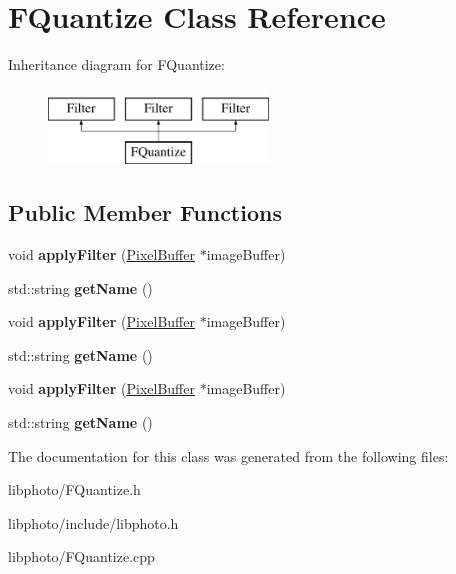 \hypertarget{classFQuantize}{\section{F\-Quantize Class Reference}
\label{classFQuantize}
}
Inheritance diagram for F\-Quantize\-:\begin{figure}[H]
\begin{center}
\leavevmode
\includegraphics[height=2.000000cm]{classFQuantize}
\end{center}
\end{figure}
\subsection*{Public Member Functions}
\begin{DoxyCompactItemize}
\item 
\hypertarget{classFQuantize_a093d0f34480882da50d994eb4e450c64}{void {\bfseries apply\-Filter} (\hyperlink{classPixelBuffer}{Pixel\-Buffer} $\ast$image\-Buffer)}\label{classFQuantize_a093d0f34480882da50d994eb4e450c64}

\item 
\hypertarget{classFQuantize_a9432e52568e0b7608522569e0a438a1d}{std\-::string {\bfseries get\-Name} ()}\label{classFQuantize_a9432e52568e0b7608522569e0a438a1d}

\item 
\hypertarget{classFQuantize_a093d0f34480882da50d994eb4e450c64}{void {\bfseries apply\-Filter} (\hyperlink{classPixelBuffer}{Pixel\-Buffer} $\ast$image\-Buffer)}\label{classFQuantize_a093d0f34480882da50d994eb4e450c64}

\item 
\hypertarget{classFQuantize_a9432e52568e0b7608522569e0a438a1d}{std\-::string {\bfseries get\-Name} ()}\label{classFQuantize_a9432e52568e0b7608522569e0a438a1d}

\item 
\hypertarget{classFQuantize_a093d0f34480882da50d994eb4e450c64}{void {\bfseries apply\-Filter} (\hyperlink{classPixelBuffer}{Pixel\-Buffer} $\ast$image\-Buffer)}\label{classFQuantize_a093d0f34480882da50d994eb4e450c64}

\item 
\hypertarget{classFQuantize_a9432e52568e0b7608522569e0a438a1d}{std\-::string {\bfseries get\-Name} ()}\label{classFQuantize_a9432e52568e0b7608522569e0a438a1d}

\end{DoxyCompactItemize}


The documentation for this class was generated from the following files\-:\begin{DoxyCompactItemize}
\item 
libphoto/F\-Quantize.\-h\item 
libphoto/include/libphoto.\-h\item 
libphoto/F\-Quantize.\-cpp\end{DoxyCompactItemize}
